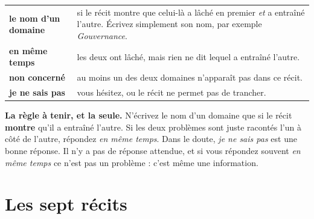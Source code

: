 \documentclass[11pt,a4paper]{article}
\begin{document}
\begin{center}
\renewcommand{\arraystretch}{1.3}
\begin{tabular}{@{}>{\bfseries}p{4.6cm} p{11.6cm}@{}}
\toprule
le nom d'un domaine & si le récit montre que celui-là a lâché en premier \emph{et} a entraîné
l'autre. Écrivez simplement son nom, par exemple \emph{Gouvernance}. \\
en même temps & les deux ont lâché, mais rien ne dit lequel a entraîné l'autre. \\
non concerné & au moins un des deux domaines n'apparaît pas dans ce récit. \\
je ne sais pas & vous hésitez, ou le récit ne permet pas de trancher. \\
\bottomrule
\end{tabular}
\end{center}

\begin{cle}[colback=accent!7,colframe=accent!70!black]
\textbf{La règle à tenir, et la seule.} N'écrivez le nom d'un domaine que si le récit
\textbf{montre} qu'il a entraîné l'autre. Si les deux problèmes sont juste racontés l'un à côté
de l'autre, répondez \emph{en même temps}. Dans le doute, \emph{je ne sais pas} est une bonne
réponse. Il n'y a pas de réponse attendue, et si vous répondez souvent \emph{en même temps} ce
n'est pas un problème : c'est même une information.
\end{cle}

\newpage
\section*{Les sept récits}
\end{document}
